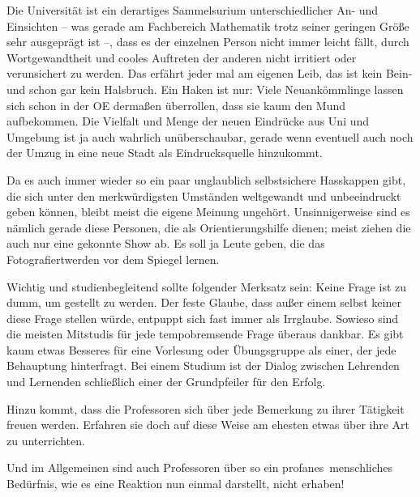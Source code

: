 Die Universität ist ein derartiges Sammelsurium unterschiedlicher An- und
Einsichten -- was gerade am Fachbereich Mathematik trotz seiner geringen Größe
sehr ausgeprägt ist --, dass es der einzelnen Person nicht immer leicht fällt,
durch Wortgewandtheit und cooles Auftreten der anderen nicht irritiert oder
verunsichert zu werden. Das erfährt jeder mal am eigenen Leib, das ist kein
Bein- und schon gar kein Halsbruch. Ein Haken ist nur: Viele Neuankömmlinge
lassen sich schon in der OE dermaßen überrollen, dass sie kaum den Mund
aufbekommen. Die Vielfalt und Menge der neuen Eindrücke aus Uni und Umgebung
ist ja auch wahrlich unüberschaubar, gerade wenn eventuell auch noch der Umzug
in eine neue Stadt als Eindrucksquelle hinzukommt.

Da es auch immer wieder so ein paar unglaublich selbstsichere Hasskappen gibt,
die sich unter den merkwürdigsten Umständen weltgewandt und unbeeindruckt geben
können, bleibt meist die eigene Meinung ungehört. Unsinnigerweise sind es
nämlich gerade diese Personen, die als Orientierungshilfe dienen; meist ziehen
die auch nur eine gekonnte Show ab. Es soll ja Leute geben, die das
Fotografiertwerden vor dem Spiegel lernen.

Wichtig und studienbegleitend sollte folgender Merksatz sein: Keine Frage ist
zu dumm, um gestellt zu werden. Der feste Glaube, dass außer einem selbst
keiner diese Frage stellen würde, entpuppt sich fast immer als Irrglaube.
Sowieso sind die meisten Mitstudis für jede tempobremsende Frage überaus
dankbar. Es gibt kaum etwas Besseres für eine Vorlesung oder Übungsgruppe als
einer, der jede Behauptung hinterfragt. Bei einem Studium ist der Dialog
zwischen Lehrenden und Lernenden schließlich einer der Grundpfeiler für den
Erfolg.

Hinzu kommt, dass die Professoren sich über jede Bemerkung zu ihrer Tätigkeit
freuen werden. Erfahren sie doch auf diese Weise am ehesten etwas über ihre Art
zu unterrichten.

Und im Allgemeinen sind auch Professoren über so ein \glqq profanes\grqq\
menschliches Bedürfnis, wie es eine Reaktion nun einmal darstellt, nicht
erhaben!
